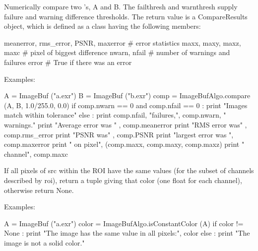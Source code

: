  

Numerically compare two \ImageBuf's, {\cf A} and {\cf B}. The {\cf failthresh}
and {\cf warnthresh} supply failure and warning difference thresholds.
The return value is a {\cf CompareResults} object,
which is defined as a class having the following members:
\begin{code}
    meanerror, rms_error, PSNR, maxerror  # error statistics
    maxx, maxy, maxz, maxc                # pixel of biggest difference
    nwarn, nfail                          # number of warnings and failures
    error                                 # True if there was an error
\end{code}

\smallskip
\noindent Examples:
\begin{code}
    A = ImageBuf ("a.exr")
    B = ImageBuf ("b.exr")
    comp = ImageBufAlgo.compare (A, B, 1.0/255.0, 0.0)
    if comp.nwarn == 0 and comp.nfail == 0 :
        print "Images match within tolerance"
    else :
        print comp.nfail, "failures,", comp.nwarn, " warnings."
        print "Average error was " , comp.meanerror
        print "RMS error was" , comp.rms_error
        print "PSNR was" , comp.PSNR
        print "largest error was ", comp.maxerror
        print "  on pixel", (comp.maxx, comp.maxy, comp.maxz)
        print "  channel", comp.maxc
\end{code}
\apiend


 

If all pixels of {\cf src} within the ROI have the same values (for the
subset of channels described by {\cf roi}), return a tuple giving that
color (one {\cf float} for each channel), otherwise return {\cf None}.

\smallskip
\noindent Examples:
\begin{code}
    A = ImageBuf ("a.exr")
    color = ImageBufAlgo.isConstantColor (A)
    if color != None :
        print "The image has the same value in all pixels:", color
    else :
        print "The image is not a solid color."
\end{code}
\apiend


 

